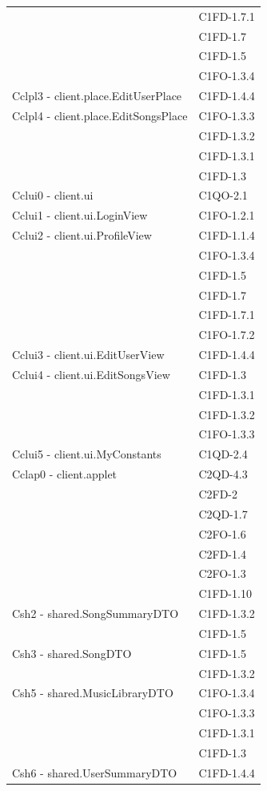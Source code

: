 \begin{footnotesize}
\begin{longtable}[!h]{|l|l|}
& C1FD-1.7.1 \\
& C1FD-1.7 \\
& C1FD-1.5 \\
& C1FO-1.3.4 \\\hline
Cclpl3 - client.place.EditUserPlace & C1FD-1.4.4 \\\hline
Cclpl4 - client.place.EditSongsPlace & C1FO-1.3.3 \\
& C1FD-1.3.2 \\
& C1FD-1.3.1 \\
& C1FD-1.3 \\ \hline
Cclui0 - client.ui & C1QO-2.1 \\\hline
Cclui1 - client.ui.LoginView & C1FO-1.2.1 \\\hline
Cclui2 - client.ui.ProfileView & C1FD-1.1.4 \\
& C1FO-1.3.4 \\
& C1FD-1.5 \\
& C1FD-1.7 \\
& C1FD-1.7.1 \\
& C1FO-1.7.2 \\\hline
Cclui3 - client.ui.EditUserView & C1FD-1.4.4 \\\hline
Cclui4 - client.ui.EditSongsView & C1FD-1.3 \\
& C1FD-1.3.1 \\
& C1FD-1.3.2 \\
& C1FO-1.3.3 \\\hline
Cclui5 - client.ui.MyConstants & C1QD-2.4 \\\hline
Cclap0 - client.applet & C2QD-4.3 \\
& C2FD-2 \\
& C2QD-1.7 \\
& C2FO-1.6 \\
& C2FD-1.4 \\
& C2FO-1.3 \\\
& C1FD-1.10 \\\hline
Csh2 - shared.SongSummaryDTO & C1FD-1.3.2 \\
& C1FD-1.5 \\\hline
Csh3 - shared.SongDTO & C1FD-1.5 \\
& C1FD-1.3.2 \\\hline
Csh5 - shared.MusicLibraryDTO & C1FO-1.3.4 \\
& C1FO-1.3.3 \\
& C1FD-1.3.1 \\
& C1FD-1.3 \\\hline
Csh6 - shared.UserSummaryDTO & C1FD-1.4.4 \\\hline

\end{longtable}
\end{footnotesize}
